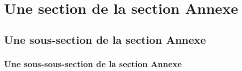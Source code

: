 \documentclass[10pt,twoside,fleqn,english,french]{actuecon}
\begin{document}
		\section{Une section de la section Annexe}
		
		\subsection{Une sous-section de la section Annexe}
		
		\subsubsection{Une sous-sous-section de la section Annexe}
									
	\AEbibliographie
	
	
		
\end{document}
